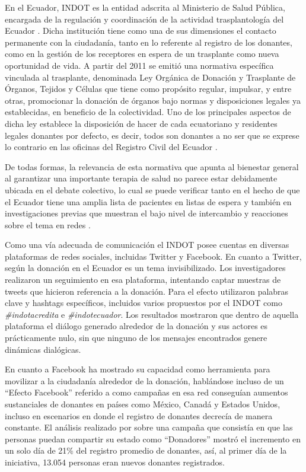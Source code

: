 \documentclass[spanish]{textolivre}
\begin{document}
En el Ecuador, INDOT es la entidad adscrita al Ministerio de Salud Pública, encargada de la regulación y coordinación de la actividad trasplantología del Ecuador \cite{indot2011}. Dicha institución tiene como una de sus dimensiones el contacto permanente con la ciudadanía, tanto en lo referente al registro de los donantes, como en la gestión de los receptores en espera de un trasplante como nueva oportunidad de vida. A partir del 2011 se emitió una normativa específica vinculada al trasplante, denominada Ley Orgánica de Donación y Trasplante de Órganos, Tejidos y Células que tiene como propósito regular, impulsar, y entre otras, promocionar la donación de órganos bajo normas y disposiciones legales ya establecidas, en beneficio de la colectividad. Uno de los principales aspectos de dicha ley establece la disposición de hacer de cada ecuatoriano y residentes legales donantes por defecto, es decir, todos son donantes a no ser que se exprese lo contrario en las oficinas del Registro Civil del Ecuador \cite{indot2011}. 

De todas formas, la relevancia de esta normativa que apunta al bienestar general al garantizar una importante terapia de salud no parece estar debidamente ubicada en el debate colectivo, lo cual se puede verificar tanto en el hecho de que el Ecuador tiene una amplia lista de pacientes en listas de espera y también en investigaciones previas que muestran el bajo nivel de intercambio y reacciones sobre el tema en redes \cite{dos_santos2020}. 

Como una vía adecuada de comunicación el INDOT posee cuentas en diversas plataformas de redes sociales, incluidas Twitter y Facebook. En cuanto a Twitter, según \textcite{dos_santos2020} la donación en el Ecuador es un tema invisibilizado. Los investigadores realizaron un seguimiento en esa plataforma, intentando captar muestras de tweets que hicieron referencia a la donación. Para el efecto utilizaron palabras clave y hashtags específicos, incluidos varios propuestos por el INDOT como \emph{\#indotacredita} e \emph{\#indotecuador}. Los resultados mostraron que dentro de aquella plataforma el diálogo generado alrededor de la donación y sus actores es prácticamente nulo, sin que ninguno de los mensajes encontrados genere dinámicas dialógicas.

En cuanto a Facebook ha mostrado su capacidad como herramienta para movilizar a la ciudadanía alrededor de la donación, hablándose incluso de un “Efecto Facebook” referido a como campañas en esa red conseguían aumentos sustanciales de donantes en países como México, Canadá \cite{shots2012} y Estados Unidos, incluso en escenarios en donde el registro de donantes decrecía de manera constante. El análisis realizado por \textcite{cameronetal2013} sobre una campaña que consistía en que las personas puedan compartir su estado como “Donadores” mostró el incremento en un solo día de 21\% del registro promedio de donantes, así, al primer día de la iniciativa, 13.054 personas eran nuevos donantes registrados.
\end{document}
